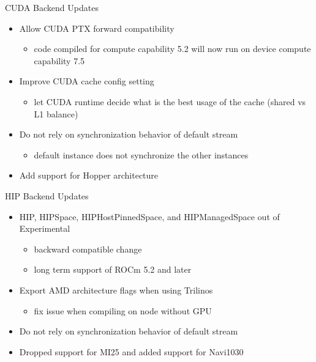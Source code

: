 
\begin{frame}[fragile]{CUDA Backend Updates}
  \begin{itemize}
    \item Allow CUDA PTX forward compatibility 
      \begin{itemize}
        \item code compiled for compute capability 5.2 will now run on device compute capability 7.5
      \end{itemize}
    \item Improve CUDA cache config setting
      \begin{itemize}
        \item let CUDA runtime decide what is the best usage of the cache (shared vs L1 balance)
      \end{itemize}
    \item Do not rely on synchronization behavior of default stream
      \begin{itemize}
        \item default instance does not synchronize the other instances
      \end{itemize}
    \item Add support for Hopper architecture
  \end{itemize}
\end{frame}


\begin{frame}[fragile]{HIP Backend Updates}
  \begin{itemize}
    \item HIP, HIPSpace, HIPHostPinnedSpace, and HIPManagedSpace out of
      Experimental
      \begin{itemize}
        \item backward compatible change
        \item long term support of ROCm 5.2 and later
      \end{itemize}
    \item Export AMD architecture flags when using Trilinos
      \begin{itemize}
        \item fix issue when compiling on node without GPU
      \end{itemize}
    \item Do not rely on synchronization behavior of default stream
    \item Dropped support for MI25 and added support for Navi1030
  \end{itemize}
\end{frame}

